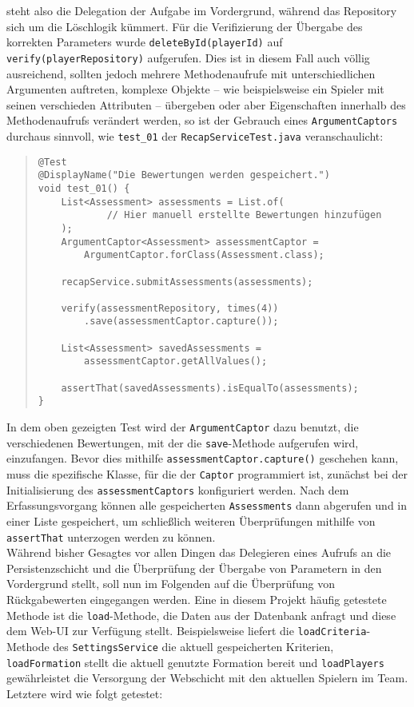 steht also die Delegation der Aufgabe im Vordergrund, während das Repository sich 
um die Löschlogik kümmert. Für die Verifizierung der Übergabe des korrekten 
Parameters wurde \texttt{deleteById(playerId)} auf \texttt{verify(playerRepository)} 
aufgerufen. Dies ist in diesem Fall auch völlig ausreichend, sollten jedoch mehrere 
Methodenaufrufe mit unterschiedlichen Argumenten auftreten, komplexe Objekte -- wie 
beispielsweise ein Spieler mit seinen verschieden Attributen -- übergeben oder aber 
Eigenschaften innerhalb des Methodenaufrufs verändert werden, so ist der Gebrauch 
eines \texttt{ArgumentCaptors} durchaus sinnvoll, wie \texttt{test\_01} der 
\texttt{RecapServiceTest.java} veranschaulicht: 

\begin{quote}
\begin{verbatim}
@Test
@DisplayName("Die Bewertungen werden gespeichert.")
void test_01() {
    List<Assessment> assessments = List.of(
            // Hier manuell erstellte Bewertungen hinzufügen 
    );
    ArgumentCaptor<Assessment> assessmentCaptor = 
        ArgumentCaptor.forClass(Assessment.class);

    recapService.submitAssessments(assessments);

    verify(assessmentRepository, times(4))
        .save(assessmentCaptor.capture());

    List<Assessment> savedAssessments = 
        assessmentCaptor.getAllValues();

    assertThat(savedAssessments).isEqualTo(assessments);
}
\end{verbatim}
\end{quote}

In dem oben gezeigten Test wird der \texttt{ArgumentCaptor} dazu benutzt, die 
verschiedenen Bewertungen, mit der die \texttt{save}-Methode aufgerufen wird, 
einzufangen. Bevor dies mithilfe \texttt{assessmentCaptor.capture()} geschehen kann, 
muss die spezifische Klasse, für die der \texttt{Captor} programmiert ist, zunächst 
bei der Initialisierung des \texttt{assessmentCaptors} konfiguriert werden. Nach dem 
Erfassungsvorgang können alle gespeicherten \texttt{Assessments} dann abgerufen und 
in einer Liste gespeichert, um schließlich weiteren Überprüfungen mithilfe von 
\texttt{assertThat} unterzogen werden zu können. \\ 
Während bisher Gesagtes vor allen Dingen das Delegieren eines Aufrufs an die 
Persistenzschicht und die Überprüfung der Übergabe von Parametern in den Vordergrund 
stellt, soll nun im Folgenden auf die Überprüfung von Rückgabewerten eingegangen 
werden. Eine in diesem Projekt häufig getestete Methode ist die 
\texttt{load}-Methode, die Daten aus der Datenbank anfragt und diese dem Web-UI zur 
Verfügung stellt. Beispielsweise liefert die \texttt{loadCriteria}-Methode des 
\texttt{SettingsService} die aktuell gespeicherten Kriterien, \texttt{loadFormation} 
stellt die aktuell genutzte Formation bereit und \texttt{loadPlayers} gewährleistet 
die Versorgung der Webschicht mit den aktuellen Spielern im Team. Letztere wird wie folgt getestet: 

